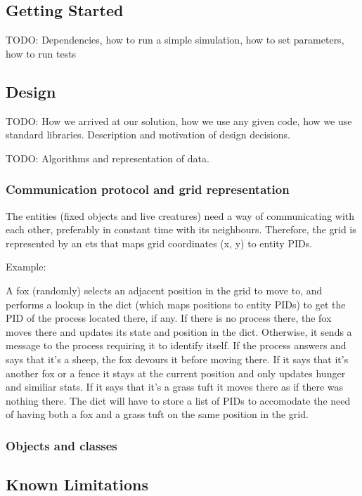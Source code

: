 \documentclass[12pt]{article}
\begin{document}
\subsection{Getting Started}

TODO: Dependencies, how to run a simple simulation, how to set parameters, how to run tests

\subsection{Design}

TODO: How we arrived at our solution, how we use any given code, how we use standard libraries. Description and motivation of design decisions.

TODO: Algorithms and representation of data.

\subsubsection{Communication protocol and grid representation}

The entities (fixed objects and live creatures) need a way of communicating with each other, preferably in constant time with its neighbours. Therefore, the grid is represented by an ets that maps grid coordinates (x, y) to entity PIDs.

Example:

A fox (randomly) selects an adjacent position in the grid to move to, and performs a lookup in the dict (which maps positions to entity PIDs) to get the PID of the process located there, if any. 
If there is no process there, the fox moves there and updates its state and position in the dict. 
Otherwise, it sends a message to the process requiring it to identify itself. 
If the process answers and says that it's a sheep, the fox devours it before moving there. 
If it says that it's another fox or a fence it stays at the current position and only updates hunger and similiar stats. 
If it says that it's a grass tuft it moves there as if there was nothing there. 
The dict will have to store a list of PIDs to accomodate the need of having both a fox and a grass tuft on the same position in the grid.

\subsubsection{Objects and classes}

\subsection{Known Limitations}
\end{document}
